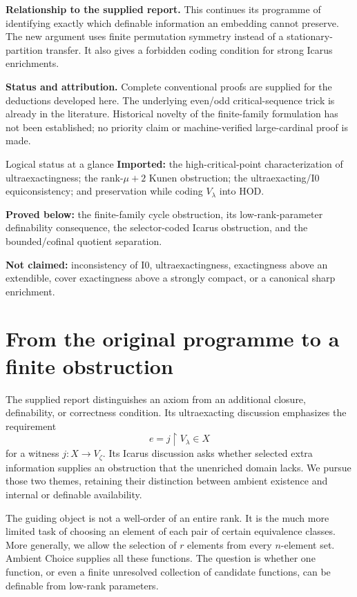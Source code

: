 \documentclass[11pt,letterpaper]{article}
\theoremstyle{definition}
\newcommand{\restr}{\mathbin{\upharpoonright}}
\newcommand{\Izero}{\mathrm{I0}}
\begin{document}
\textbf{Relationship to the supplied report.} This continues its programme of identifying exactly which definable information an embedding cannot preserve. The new argument uses finite permutation symmetry instead of a stationary-partition transfer. It also gives a forbidden coding condition for strong Icarus enrichments.

\textbf{Status and attribution.} Complete conventional proofs are supplied for the deductions developed here. The underlying even/odd critical-sequence trick is already in the literature. Historical novelty of the finite-family formulation has not been established; no priority claim or machine-verified large-cardinal proof is made.

\clearpage
\tableofcontents
\vspace{8pt}
\begin{assessment}{Logical status at a glance}
\textbf{Imported:} the high-critical-point characterization of ultraexactingness; the rank-$\mu+2$ Kunen obstruction; the ultraexacting/$\Izero$ equiconsistency; and preservation while coding $V_\lambda$ into HOD.

\textbf{Proved below:} the finite-family cycle obstruction, its low-rank-parameter definability consequence, the selector-coded Icarus obstruction, and the bounded/cofinal quotient separation.

\textbf{Not claimed:} inconsistency of $\Izero$, ultraexactingness, exactingness above an extendible, cover exactingness above a strongly compact, or a canonical sharp enrichment.
\end{assessment}

\clearpage
\section{From the original programme to a finite obstruction}\label{sec:programme}

The supplied report \cite{unified} distinguishes an axiom from an additional closure, definability, or correctness condition. Its ultraexacting discussion emphasizes the requirement
\[
 e=j\restr V_\lambda\in X
\]
for a witness $j:X\to V_\zeta$. Its Icarus discussion asks whether selected extra information supplies an obstruction that the unenriched domain lacks. We pursue those two themes, retaining their distinction between ambient existence and internal or definable availability.

The guiding object is not a well-order of an entire rank. It is the much more limited task of choosing an element of each pair of certain equivalence classes. More generally, we allow the selection of $r$ elements from every $n$-element set. Ambient Choice supplies all these functions. The question is whether one function, or even a finite unresolved collection of candidate functions, can be definable from low-rank parameters.
\end{document}
